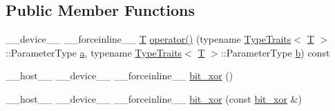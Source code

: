 \subsection*{Public Member Functions}
\begin{DoxyCompactItemize}
\item 
\-\_\-\-\_\-device\-\_\-\-\_\- \-\_\-\-\_\-forceinline\-\_\-\-\_\- \hyperlink{calib3d_8hpp_a3efb9551a871ddd0463079a808916717}{T} \hyperlink{structcv_1_1gpu_1_1device_1_1bit__xor_ae66edbea9ba8663a5198dd954ee6c219}{operator()} (typename \hyperlink{structcv_1_1gpu_1_1device_1_1TypeTraits}{Type\-Traits}$<$ \hyperlink{calib3d_8hpp_a3efb9551a871ddd0463079a808916717}{T} $>$\-::Parameter\-Type \hyperlink{legacy_8hpp_a1031d0e0a97a340abfe0a6ab9e831045}{a}, typename \hyperlink{structcv_1_1gpu_1_1device_1_1TypeTraits}{Type\-Traits}$<$ \hyperlink{calib3d_8hpp_a3efb9551a871ddd0463079a808916717}{T} $>$\-::Parameter\-Type \hyperlink{legacy_8hpp_ac04272e8ca865b8fba18d36edae9fd2a}{b}) const 
\item 
\-\_\-\-\_\-host\-\_\-\-\_\- \-\_\-\-\_\-device\-\_\-\-\_\- \-\_\-\-\_\-forceinline\-\_\-\-\_\- \hyperlink{structcv_1_1gpu_1_1device_1_1bit__xor_ac827ae5f01629d1c67bb42324e4b528a}{bit\-\_\-xor} ()
\item 
\-\_\-\-\_\-host\-\_\-\-\_\- \-\_\-\-\_\-device\-\_\-\-\_\- \-\_\-\-\_\-forceinline\-\_\-\-\_\- \hyperlink{structcv_1_1gpu_1_1device_1_1bit__xor_a5fbe17506c3aff15cdac09fdbc946b33}{bit\-\_\-xor} (const \hyperlink{structcv_1_1gpu_1_1device_1_1bit__xor}{bit\-\_\-xor} \&)
\end{DoxyCompactItemize}


